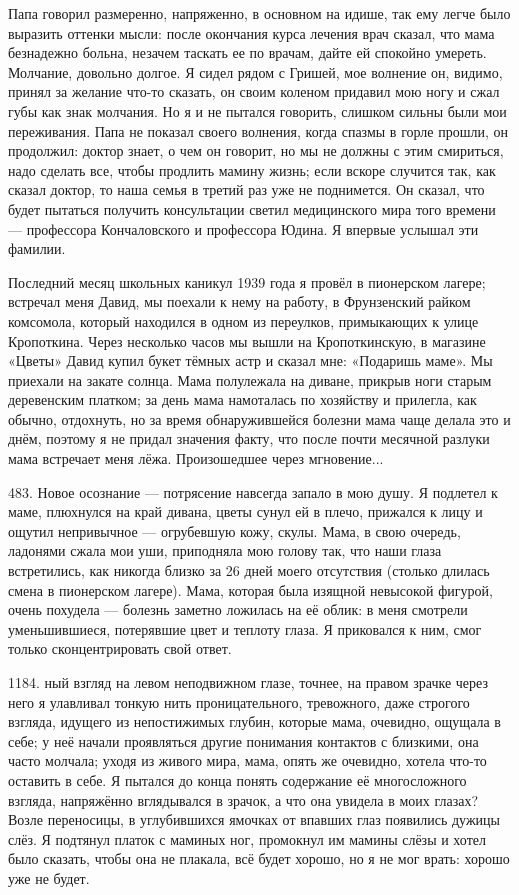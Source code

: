 Папа говорил размеренно, напряженно, в основном на идише, так ему легче было выразить оттенки мысли: после окончания курса лечения врач сказал, что мама безнадежно больна, незачем таскать ее по врачам, дайте ей спокойно умереть. Молчание, довольно долгое. Я сидел рядом с Гришей, мое волнение он, видимо, принял за желание что-то сказать, он своим коленом придавил мою ногу и сжал губы как знак молчания. Но я и не пытался говорить, слишком сильны были мои переживания. Папа не показал своего волнения, когда спазмы в горле прошли, он продолжил: доктор знает, о чем он говорит, но мы не должны с этим смириться, надо сделать все, чтобы продлить мамину жизнь; если вскоре случится так, как сказал доктор, то наша семья в третий раз уже не поднимется. Он сказал, что будет пытаться получить консультации светил медицинского мира того времени — профессора Кончаловского и профессора Юдина. Я впервые услышал эти фамилии.

Последний месяц школьных каникул 1939 года я провёл в пионерском лагере; встречал меня Давид, мы поехали к нему на работу, в Фрунзенский райком комсомола, который находился в одном из переулков, примыкающих к улице Кропоткина. Через несколько часов мы вышли на Кропоткинскую, в магазине «Цветы» Давид купил букет тёмных астр и сказал мне: «Подаришь маме». Мы приехали на закате солнца. Мама полулежала на диване, прикрыв ноги старым деревенским платком; за день мама намоталась по хозяйству и прилегла, как обычно, отдохнуть, но за время обнаружившейся болезни мама чаще делала это и днём, поэтому я не придал значения факту, что после почти месячной разлуки мама встречает меня лёжа. Произошедшее через мгновение...

483.
Новое осознание — потрясение навсегда запало в мою душу.
Я подлетел к маме, плюхнулся на край дивана, цветы сунул ей в плечо, прижался к лицу и ощутил непривычное — огрубевшую кожу, скулы. Мама, в свою очередь, ладонями сжала мои уши, приподняла мою голову так, что наши глаза встретились, как никогда близко за 26 дней моего отсутствия (столько длилась смена в пионерском лагере). Мама, которая была изящной невысокой фигурой, очень похудела — болезнь заметно ложилась на её облик: в меня смотрели уменьшившиеся, потерявшие цвет и теплоту глаза. Я приковался к ним, смог только сконцентрировать свой ответ.

1184. ный взгляд на левом неподвижном глазе, точнее, на правом зрачке через него я улавливал тонкую нить проницательного, тревожного, даже строгого взгляда, идущего из непостижимых глубин, которые мама, очевидно, ощущала в себе; у неё начали проявляться другие понимания контактов с близкими, она часто молчала; уходя из живого мира, мама, опять же очевидно, хотела что-то оставить в себе. Я пытался до конца понять содержание её многосложного взгляда, напряжённо вглядывался в зрачок, а что она увидела в моих глазах? Возле переносицы, в углубившихся ямочках от впавших глаз появились дужицы слёз. Я подтянул платок с маминых ног, промокнул им мамины слёзы и хотел было сказать, чтобы она не плакала, всё будет хорошо, но я не мог врать: хорошо уже не будет.

